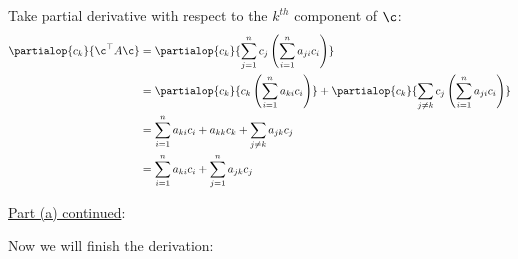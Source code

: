 \documentclass[12pt]{article}
\newcommand{\snmath}{\displaystyle\sum_{i=1}^n}
\begin{document}
\begin{enumerate}
\begin{tcolorbox}[colback=white, sharp corners]
Take partial derivative with respect to the $k^{th}$ component of $\c$: 
\begin{align*}
\partialop{c_k}{\c^\top A \c} &= \partialop{c_k}{\sum_{j=1}^n c_j \left( \snmath a_{ji} c_i \right)}\\
&= \partialop{c_k}{c_k \left( \snmath a_{ki} c_i \right)} + \partialop{c_k}{\sum_{j\neq k} c_j \left( \snmath a_{ji} c_i \right)} \\
&= \snmath a_{ki} c_i + a_{kk} c_k + \sum_{j\neq k} a_{jk} c_j\\
&= \snmath a_{ki} c_i  + \sum_{j =  1}^n a_{jk} c_j
\end{align*}

\end{tcolorbox}

\newpage
\begin{tcolorbox}[colback = white, sharp corners]

\underline{Part (a) continued}: 

\vspace{3mm}

Now we will finish the derivation: 


\end{tcolorbox}
\end{enumerate}
\end{document}
